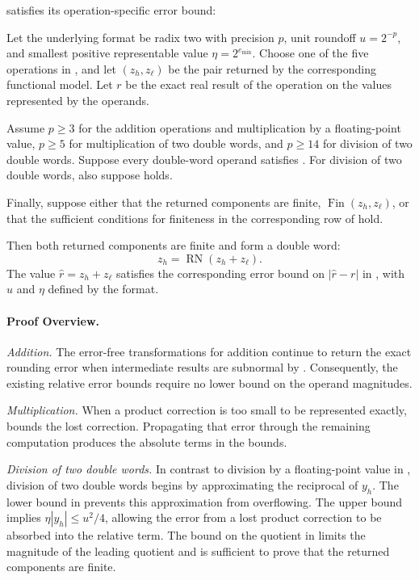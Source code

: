 satisfies its operation-specific error bound:
%
\begin{theorem}
\label{thm:remaining-numerical-guarantees}
Let the underlying format be radix two with precision $p$, unit
roundoff $u=2^{-p}$, and smallest positive representable value
$\eta=2^{e_{\min}}$. Choose one of the five operations in
, and let $(z_h,z_\ell)$
be the pair returned by the corresponding functional model.
Let $r$ be the exact real result of the operation on the values
represented by the operands.

Assume $p\geq3$ for the addition operations and multiplication by a
floating-point value, $p\geq5$ for multiplication of two double
words, and $p\geq14$ for division of two double words. Suppose every
double-word operand satisfies . For division
of two double words, also suppose
 holds.

Finally, suppose either that the returned components are finite,
$\operatorname{Fin}(z_h,z_\ell)$, or that the sufficient conditions
for finiteness in the corresponding row of
 hold.

Then both returned components are finite and form a double word:
\[
  z_h=\operatorname{RN}(z_h+z_\ell).
\]
The value $\widehat r=z_h+z_\ell$ satisfies the
corresponding error bound on $|\widehat r-r|$ in
, with $u$ and $\eta$ defined by the format.
\end{theorem}

\paragraph{Proof Overview.}
\emph{Addition.}
The error-free transformations for addition continue to return the exact
rounding error when intermediate results are subnormal by
. Consequently, the existing relative
error bounds require no lower bound on the operand magnitudes.

\emph{Multiplication.}
When a product correction is too small to be represented exactly,
 bounds the lost correction. Propagating that error
through the remaining computation produces the absolute terms in the 
 bounds.

\emph{Division of two double words.}
In contrast to division by a floating-point value in
, division of two double words begins by approximating the
reciprocal of $y_h$. The lower bound in
 prevents this approximation from
overflowing. The upper bound implies $\eta|y_h|\leq u^2/4$, allowing the error
from a lost product correction to be absorbed into the relative term. 
The bound on the quotient in  limits the
magnitude of the leading quotient and is sufficient to prove that the returned
components are finite.
